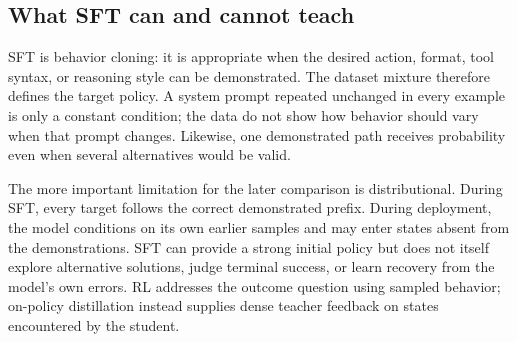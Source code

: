 \subsection{What SFT can and cannot teach}

SFT is behavior cloning: it is appropriate when the desired action, format, tool syntax,
or reasoning style can be demonstrated. The dataset mixture therefore defines the target
policy. A system prompt repeated unchanged in every example is only a constant condition;
the data do not show how behavior should vary when that prompt changes. Likewise, one
demonstrated path receives probability even when several alternatives would be valid.

The more important limitation for the later comparison is distributional. During SFT,
every target follows the correct demonstrated prefix. During deployment, the model
conditions on its own earlier samples and may enter states absent from the demonstrations.
SFT can provide a strong initial policy but does not itself explore alternative solutions,
judge terminal success, or learn recovery from the model's own errors. RL addresses the
outcome question using sampled behavior; on-policy distillation instead supplies dense
teacher feedback on states encountered by the student.

